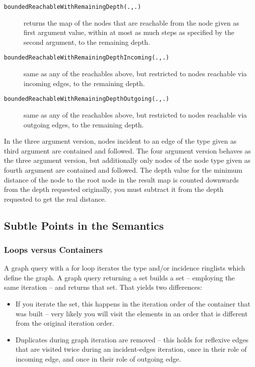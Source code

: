 \begin{description}
\item[\texttt{boundedReachableWithRemainingDepth(.,.)}] returns the map of the nodes that are reachable from the node given as first argument value, within at most as much steps as specified by the second argument, to the remaining depth.
\item[\texttt{boundedReachableWithRemainingDepthIncoming(.,.)}] same as any of the reachables above, but restricted to nodes reachable via incoming edges, to the remaining depth.
\item[\texttt{boundedReachableWithRemainingDepthOutgoing(.,.)}] same as any of the reachables above, but restricted to nodes reachable via outgoing edges, to the remaining depth.
\end{description}

In the three argument version, nodes incident to an edge of the type given as third argument are contained and followed.
The four argument version behaves as the three argument version, but additionally only nodes of the node type given as fourth argument are contained and followed.
The depth value for the minimum distance of the node to the root node in the result map is counted downwards from the depth requested originally, you must subtract it from the depth requested to get the real distance.

\subsection{Subtle Points in the Semantics}\label{sub:subtle}

\subsubsection*{Loops versus Containers}
A graph query with a for loop iterates the type and/or incidence ringlists which define the graph.
A graph query returning a set builds a set -- employing the same iteration -- and returns that set.
That yields two differences:
\begin{itemize}
	\item If you iterate the set, this happens in the iteration order of the container that was built -- very likely you will visit the elements in an order that is different from the original iteration order.
	\item Duplicates during graph iteration are removed -- this holds for reflexive edges that are visited twice during an incident-edges iteration, once in their role of incoming edge, and once in their role of outgoing edge.
\end{itemize}

